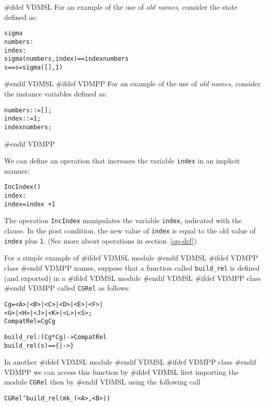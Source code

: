 \documentclass[\pformat,12pt]{article}
\begin{document}
\begin{description}
#ifdef VDMSL
  For an example of the use of {\it old names}, consider the state defined
  as:
  \begin{alltt}
     sigma 
      numbers : 
      index   : 
      sigma(numbers, index) == index  numbers
     s == s = sigma([], 1)
  \end{alltt}
#endif VDMSL
#ifdef VDMPP
  For an example of the use of {\it old names}, consider the instance 
  variables defined as:
  \begin{alltt}
      numbers:  := [];
      index  :  := 1;
     index  numbers;
  \end{alltt}
#endif VDMPP

  We can define an operation that increases the variable {\tt index} in
  an implicit manner:
  \begin{alltt}
    IncIndex()
     index : 
     index = index~ + 1
  \end{alltt}
  The operation {\tt IncIndex} manipulates the variable {\tt index},
  indicated with the  clause. In the post condition, the new
  value of {\tt index} is equal to the old value of {\tt index} plus
  \texttt{1}. (See more about operations in section~\ref{op-def}).

  For a simple example of 
#ifdef VDMSL
module 
#endif VDMSL
#ifdef VDMPP
class
#endif VDMPP
  names, suppose that a function called 
  \texttt{build\_rel} is defined (and exported) in a 
#ifdef VDMSL
module 
#endif VDMSL
#ifdef VDMPP
class
#endif VDMPP
  called 
  \texttt{CGRel} as follows:
\begin{alltt}

    Cg = <A> | <B> | <C> | <D> | <E> | <F> | 
         <G> | <H> | <J> | <K> | <L> | <S>;
    CompatRel =  Cg  Cg


    build_rel :  (Cg * Cg) -> CompatRel
    build_rel (s) == \{|->\}
\end{alltt}
In another 
#ifdef VDMSL
module 
#endif VDMSL
#ifdef VDMPP
class
#endif VDMPP
  we can access this function by 
#ifdef VDMSL
first importing the module \texttt{CGRel} then by 
#endif VDMSL
  using the following call 
  \begin{alltt}
  CGRel`build_rel({mk_(<A>, <B>)})
  \end{alltt}


\end{description}
\end{document}
